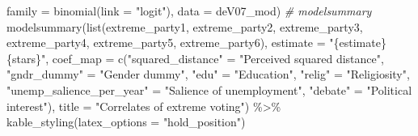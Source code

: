 \documentclass[
]{article}
\newenvironment{Shaded}{\begin{snugshade}}{\end{snugshade}}
\newcommand{\AttributeTok}[1]{\textcolor[rgb]{0.77,0.63,0.00}{#1}}
\newcommand{\CommentTok}[1]{\textcolor[rgb]{0.56,0.35,0.01}{\textit{#1}}}
\newcommand{\FunctionTok}[1]{\textcolor[rgb]{0.00,0.00,0.00}{#1}}
\newcommand{\NormalTok}[1]{#1}
\newcommand{\OtherTok}[1]{\textcolor[rgb]{0.56,0.35,0.01}{#1}}
\newcommand{\SpecialCharTok}[1]{\textcolor[rgb]{0.00,0.00,0.00}{#1}}
\newcommand{\StringTok}[1]{\textcolor[rgb]{0.31,0.60,0.02}{#1}}
\begin{document}
\begin{Shaded}
\begin{Highlighting}[]
                     \AttributeTok{family =} \FunctionTok{binomial}\NormalTok{(}\AttributeTok{link =} \StringTok{"logit"}\NormalTok{),}
                     \AttributeTok{data =}\NormalTok{ deV07\_mod)}
\CommentTok{\# modelsummary }
\FunctionTok{modelsummary}\NormalTok{(}\FunctionTok{list}\NormalTok{(extreme\_party1, extreme\_party2, extreme\_party3, extreme\_party4, extreme\_party5, extreme\_party6), }
             \AttributeTok{estimate =} \StringTok{"\{estimate\}\{stars\}"}\NormalTok{, }
             \AttributeTok{coef\_map =} \FunctionTok{c}\NormalTok{(}\StringTok{"squared\_distance"} \OtherTok{=} \StringTok{"Perceived squared distance"}\NormalTok{, }
                          \StringTok{"gndr\_dummy"} \OtherTok{=} \StringTok{"Gender dummy"}\NormalTok{, }
                          \StringTok{"edu"} \OtherTok{=} \StringTok{"Education"}\NormalTok{, }
                          \StringTok{"relig"} \OtherTok{=} \StringTok{"Religiosity"}\NormalTok{, }
                          \StringTok{"unemp\_salience\_per\_year"} \OtherTok{=} \StringTok{"Salience of unemployment"}\NormalTok{,}
                          \StringTok{"debate"} \OtherTok{=} \StringTok{"Political interest"}\NormalTok{),}
             \AttributeTok{title =} \StringTok{"Correlates of extreme voting"}\NormalTok{) }\SpecialCharTok{\%\textgreater{}\%}
  \FunctionTok{kable\_styling}\NormalTok{(}\AttributeTok{latex\_options =} \StringTok{"hold\_position"}\NormalTok{)}
\end{Highlighting}
\end{Shaded}
\end{document}
